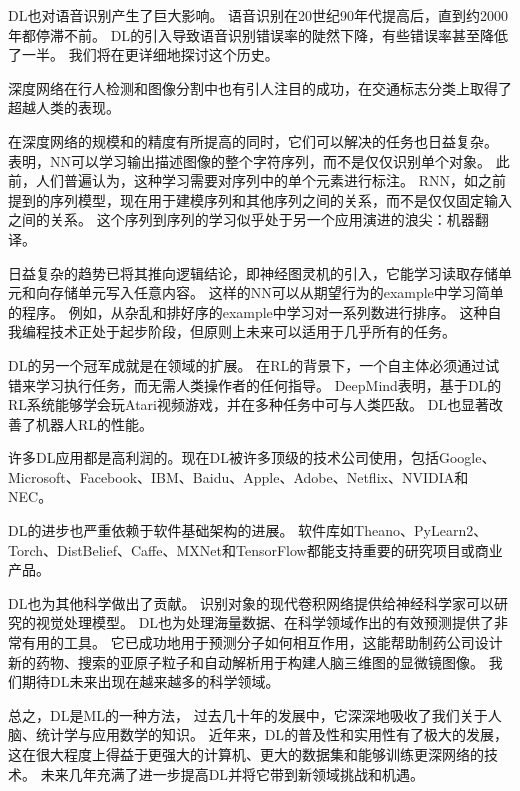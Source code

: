 
\gls{DL}也对语音识别产生了巨大影响。
语音识别在20世纪90年代提高后，直到约2000年都停滞不前。
\gls{DL}的引入\citep{dahl2010phonerec,Deng-2010,Seide2011,Hinton-et-al-2012}导致语音识别错误率的陡然下降，有些错误率甚至降低了一半。 
我们将在更详细地探讨这个历史。

深度网络在行人检测和图像分割中也有引人注目的成功\citep{sermanet-cvpr-13,Farabet-et-al-2013,couprie-iclr-13}，在交通标志分类上取得了超越人类的表现\citep{Ciresan-et-al-2012}。

在深度网络的规模和的精度有所提高的同时，它们可以解决的任务也日益复杂。
\citet{Goodfellow+et+al-ICLR2014a}表明，\gls{NN}可以学习输出描述图像的整个字符序列，而不是仅仅识别单个对象。
此前，人们普遍认为，这种学习需要对序列中的单个元素进行标注\citep{Gulcehre+Bengio-arxiv-2013}。
\gls{RNN}，如之前提到的序列模型，现在用于建模序列和其他序列之间的关系，而不是仅仅固定输入之间的关系。
这个序列到序列的学习似乎处于另一个应用演进的浪尖：机器翻译\citep{Sutskever-et-al-NIPS2014,Bahdanau-et-al-ICLR2015-small}。


日益复杂的趋势已将其推向逻辑结论，即神经图灵机\citep{Graves-et-al-arxiv2014}的引入，它能学习读取存储单元和向存储单元写入任意内容。
这样的\gls{NN}可以从期望行为的\gls{example}中学习简单的程序。
例如，从杂乱和排好序的\gls{example}中学习对一系列数进行排序。
这种自我编程技术正处于起步阶段，但原则上未来可以适用于几乎所有的任务。


\gls{DL}的另一个冠军成就是在领域的扩展。
在\gls{RL}的背景下，一个自主体必须通过试错来学习执行任务，而无需人类操作者的任何指导。
DeepMind表明，基于\gls{DL}的\gls{RL}系统能够学会玩Atari视频游戏，并在多种任务中可与人类匹敌\citep{Mnih-et-al-2015}。
\gls{DL}也显著改善了机器人\gls{RL}的性能\citep{finn2015learning}。

许多\gls{DL}应用都是高利润的。现在\gls{DL}被许多顶级的技术公司使用，包括Google、Microsoft、Facebook、IBM、Baidu、Apple、Adobe、Netflix、NVIDIA和NEC。

\gls{DL}的进步也严重依赖于软件基础架构的进展。
软件库如Theano\citep{bergstra+al:2010-scipy,Bastien-2012}、PyLearn2\citep{pylearn2_arxiv_2013}、Torch\citep{Torch-2011}、DistBelief\citep{Dean-et-al-NIPS2012}、Caffe\citep{Jia13caffe}、MXNet\citep{chen2015mxnet}和TensorFlow\citep{tensorflow}都能支持重要的研究项目或商业产品。

\gls{DL}也为其他科学做出了贡献。
识别对象的现代卷积网络提供给神经科学家可以研究的视觉处理模型\citep{dicarlo-tutorial-2013}。
\gls{DL}也为处理海量数据、在科学领域作出的有效预测提供了非常有用的工具。
它已成功地用于预测分子如何相互作用，这能帮助制药公司设计新的药物\citep{Dahl-et-al-arxiv2014}、搜索的亚原子粒子\citep{baldi2014searching}和自动解析用于构建人脑三维图的显微镜图像\citep{knowlesdeep}。
我们期待\gls{DL}未来出现在越来越多的科学领域。


总之，\gls{DL}是\gls{ML}的一种方法， 过去几十年的发展中，它深深地吸收了我们关于人脑、统计学与应用数学的知识。
近年来，\gls{DL}的普及性和实用性有了极大的发展，这在很大程度上得益于更强大的计算机、更大的数据集和能够训练更深网络的技术。
未来几年充满了进一步提高\gls{DL}并将它带到新领域挑战和机遇。

